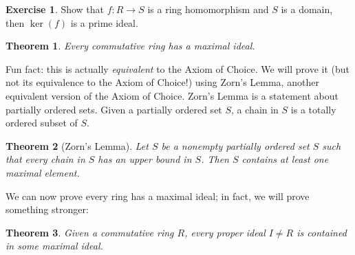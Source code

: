 \documentclass[12pt]{report}
\newtheorem{theorem}{Theorem}[chapter]
\numberwithin{equation}{section}
\numberwithin{theorem}{chapter}
\theoremstyle{definition}
\newtheorem{exercise}{Exercise}
\newtheorem*{basic properties}{Basic Properties}
\newtheorem*{Important Remark}{Important Remark}
\renewcommand{\ker}{\operatorname{ker}}
\begin{document}
\begin{exercise}
Show that $f\!: R \longrightarrow S$ is a ring homomorphism and $S$ is a domain, then $\ker(f)$ is a prime ideal.
\end{exercise}





\begin{theorem}\label{every ideal is contained in a maximal ideal}
	Every commutative ring has a maximal ideal.
\end{theorem}

Fun fact: this is actually \emph{equivalent} to the Axiom of Choice. We will prove it (but not its equivalence to the Axiom of Choice!) using Zorn's Lemma, another equivalent version of the Axiom of Choice. Zorn's Lemma is a statement about partially ordered sets. Given a partially ordered set $S$, a chain in $S$ is a totally ordered subset of $S$.

\begin{theorem}[Zorn's Lemma]\label{Zorn's Lemma}
	Let $S$ be a nonempty partially ordered set $S$ such that every chain in $S$ has an upper bound in $S$. Then $S$ contains at least one maximal element. 
\end{theorem}


We can now prove every ring has a maximal ideal; in fact, we will prove something stronger:


\begin{theorem}\label{every ideal is contained in a maximal ideal}
	Given a commutative ring $R$, every proper ideal $I \neq R$ is contained in some maximal ideal.
\end{theorem}

%
%
%
\end{document}
